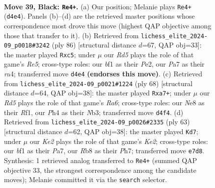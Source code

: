 \documentclass[11pt]{article}
\begin{document}
\clearpage

\begin{figure}[p]\centering
\begin{subfigure}{0.46\textwidth}\centering
\resizebox{\linewidth}{!}{%
\newchessgame
\chessboard[
  setfen={1r2n1R1/p1p1k3/2P2p2/8/3r1P1p/1P6/3B3P/4KBR1 b - - 3 39},
  showmover=false,
  pgfstyle=straightmove, color=movearrow, markmove={d4-e4}
]}
\caption{}
\end{subfigure}\hfill
\begin{subfigure}{0.46\textwidth}\centering
\resizebox{\linewidth}{!}{%
\newchessgame
\chessboard[
  setfen={3r4/2pb1k2/7p/2p1Rp2/r4N1P/6P1/4P3/3RK3 w - - 2 44},
  showmover=false,
  pgfstyle=straightmove, color=movearrow, markmove={e5-c5}
]}
\caption{}
\end{subfigure}
\\[4pt]
\begin{subfigure}{0.46\textwidth}\centering
\resizebox{\linewidth}{!}{%
\newchessgame
\chessboard[
  setfen={3r4/p5kp/R7/5p2/4p3/1N4PP/Pb3P2/3r1RK1 w - - 0 35},
  showmover=false,
  pgfstyle=straightmove, color=movearrow, markmove={a6-a7}
]}
\caption{}
\end{subfigure}\hfill
\begin{subfigure}{0.46\textwidth}\centering
\resizebox{\linewidth}{!}{%
\newchessgame
\chessboard[
  setfen={8/p3k1pp/1p1rn3/2pBR3/2P1K1PP/8/PP6/8 b - - 1 32},
  showmover=false,
  pgfstyle=straightmove, color=movearrow, markmove={e7-d7}
]}
\caption{}
\end{subfigure}
\caption{\textbf{Move 39, Black: \texttt{Re4+}.} (a) Our position; Melanie plays \texttt{Re4+} (\texttt{d4e4}). Panels (b)--(d) are the retrieved master positions whose correspondence most drove this move (highest QAP objective among those that transfer to it). (b) Retrieved from \texttt{lichess\_elite\_2024-09\_p0018\#3242} (ply 86) [structural distance $d$=67, QAP obj=33]: the master played \texttt{Rxc5}; under $\mu$ our \emph{Rd5} plays the role of that game's \emph{Re5}; cross-type roles: our \emph{b}f1 as their \emph{P}e2, our \emph{P}a7 as their \emph{r}a4; transferred move \texttt{d4e4} \textbf{(endorses this move)}. (c) Retrieved from \texttt{lichess\_elite\_2024-09\_p0021\#1224} (ply 68) [structural distance $d$=64, QAP obj=38]: the master played \texttt{Rxa7+}; under $\mu$ our \emph{Rd5} plays the role of that game's \emph{Ra6}; cross-type roles: our \emph{N}e8 as their \emph{R}f1, our \emph{P}h4 as their \emph{N}b3; transferred move \texttt{d4f4}. (d) Retrieved from \texttt{lichess\_elite\_2024-09\_p0026\#2335} (ply 63) [structural distance $d$=62, QAP obj=38]: the master played \texttt{Kd7}; under $\mu$ our \emph{Ke2} plays the role of that game's \emph{Ke2}; cross-type roles: our \emph{b}f1 as their \emph{P}a7, our \emph{R}b8 as their \emph{P}h7; transferred move \texttt{e7d8}. Synthesis: 1 retrieved analog transferred to \texttt{Re4+} (summed QAP objective 33, the strongest correspondence among the candidate moves); Melanie committed it via the \texttt{search} selector.}
\label{fig:thought-m77}
\end{figure}
\end{document}
